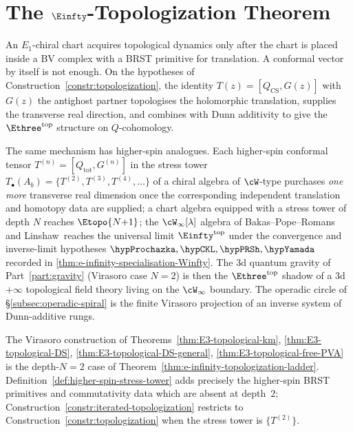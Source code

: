 
\section{The \texorpdfstring{$\Einfty$}{E\_infty}-Topologization Theorem}
\label{sec:e-infinity-topologization}

\noindent
An $E_1$-chiral chart acquires topological dynamics only after the
chart is placed inside a BV complex with a BRST primitive for
translation. A conformal vector by itself is not enough. On the
hypotheses of Construction~\ref{constr:topologization}, the identity
$T(z)=[Q_{\mathrm{CS}},G(z)]$ with $G(z)$ the antighost partner
topologises the holomorphic translation, supplies the transverse
real direction, and combines with Dunn additivity to give the
$\Ethree^{\mathrm{top}}$ structure on $Q$-cohomology.

The same mechanism has higher-spin analogues. Each higher-spin
conformal tensor $T^{(n)} = [Q_{\mathrm{tot}}, G^{(n)}]$ in the
stress tower
$T_{\bullet}(A_b) = \bigl\{ T^{(2)}, T^{(3)}, T^{(4)}, \ldots \bigr\}$
of a chiral algebra of $\cW$-type purchases \emph{one more}
transverse real dimension once the corresponding independent
translation and homotopy data are supplied; a chart algebra equipped
with a stress tower of depth $N$ reaches $\Etopo{N{+}1}$; the
$\cW_\infty[\lambda]$ algebra of Bakas--Pope--Romans and
Linshaw\,\cite{Linshaw-Winfty,Bakas-Winfty,BMP-Wsymmetry} reaches
the universal limit $\Einfty^{\mathrm{top}}$ under the convergence
and inverse-limit hypotheses
$\hypProchazka, \hypCKL, \hypPRSh, \hypYamada$ recorded in
\cref{thm:e-infinity-specialisation-Winfty}. The
$3$d quantum gravity of Part~\ref{part:gravity} (Virasoro case
$N = 2$) is then the $\Ethree^{\mathrm{top}}$ shadow of a $3$d$+\infty$
topological field theory living on the $\cW_\infty$ boundary. The
operadic circle of \S\ref{subsec:operadic-spiral} is the finite
Virasoro projection of an inverse system of Dunn-additive rungs.

\begin{remark}
\label{rem:e-infinity-placement}
The Virasoro construction of
Theorems~\ref{thm:E3-topological-km},
\ref{thm:E3-topological-DS},
\ref{thm:E3-topological-DS-general},
\ref{thm:E3-topological-free-PVA} is the depth-$N=2$ case of
Theorem~\ref{thm:e-infinity-topologization-ladder}. Definition~\ref{def:higher-spin-stress-tower}
adds precisely the higher-spin BRST primitives and commutativity data
which are absent at depth~$2$; Construction~\ref{constr:iterated-topologization}
restricts to Construction~\ref{constr:topologization} when the stress
tower is $\{T^{(2)}\}$.
\end{remark}


